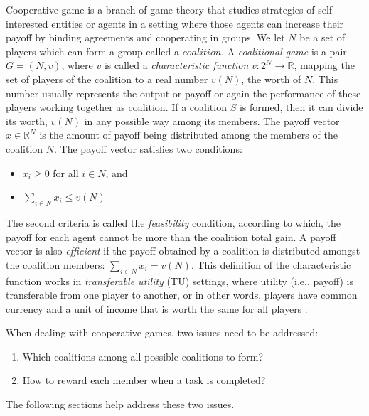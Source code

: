 
Cooperative game is a branch of game theory that studies
strategies of self-interested entities or agents in a setting
where those agents can increase their payoff by binding agreements
and cooperating in groups. We let $N$ be a set of players which
can form a group called a $coalition$. A \emph{coalitional game}
is a pair $G = (N, v)$, where $v$ is called a \emph{characteristic
function} $v: 2^N \to \mathbb{R}$, mapping the set of players of
the coalition to a real number $v(N)$, the worth of $N$. This
number usually represents the output or payoff or again the
performance of these players working together as coalition. If a
coalition $S$ is formed, then it can divide its worth, $v(N)$ in
any possible way among its members. The payoff vector $x \in
\mathbb{R}^N$ is the amount of payoff being distributed among the
members of the coalition $N$. The payoff vector satisfies two
conditions:

        \begin{itemize}
            \item $x_i \geq 0$ for all $i \in N$, and
            \item $\sum_{i \in N} x_i \leq v(N)$
        \end{itemize}

        The second criteria is called the \emph{feasibility} condition,
        according to which, the payoff for each agent cannot be more than
        the coalition total gain. A payoff vector is also \emph{efficient}
        if the payoff obtained by a coalition is distributed amongst the
        coalition members: $\sum_{i \in N} x_i = v(N)$. This definition of
        the characteristic function works in \emph{transferable utility}
        (TU) settings, where utility (i.e., payoff) is transferable from
        one player to another, or in other words, players have common
        currency and a unit of income that is worth the same for all players
        \cite{myerson1991game}.

        \noindent When dealing with cooperative games, two issues need to be
        addressed:
        \begin{enumerate}
            \item Which coalitions among all possible coalitions to form?
            \item How to reward each member when a task is completed?
        \end{enumerate}
        The following sections help address these two issues.

